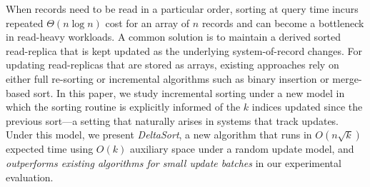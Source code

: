 When records need to be read in a particular order, sorting at query time incurs repeated $\Theta(n \log n)$ cost for an array of $n$ records and can become a bottleneck in read-heavy workloads. A common solution is to maintain a derived sorted read-replica that is kept updated as the underlying system-of-record changes. For updating read-replicas that are stored as arrays, existing approaches rely on either full re-sorting or incremental algorithms such as binary insertion or merge-based sort. In this paper, we study incremental sorting under a new model in which the sorting routine is explicitly informed of the $k$ indices updated since the previous sort—a setting that naturally arises in systems that track updates. Under this model, we present \emph{DeltaSort}, a new algorithm that runs in $O(n\sqrt{k})$ expected time using $O(k)$ auxiliary space under a random update model, and \emph{outperforms existing algorithms for small update batches} in our experimental evaluation.